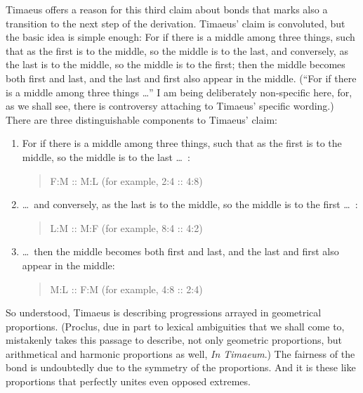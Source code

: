 Timaeus offers a reason for this third claim about bonds that marks also a transition to the next step of the derivation. Timaeus' claim is convoluted, but the basic idea is simple enough: For if there is a middle among three things, such that as the first is to the middle, so the middle is to the last, and conversely, as the last is to the middle, so the middle is to the first; then the middle becomes both first and last, and the last and first also appear in the middle. (``For if there is a middle among three things \ldots'' I am being deliberately non-specific here, for, as we shall see, there is controversy attaching to Timaeus' specific wording.) There are three distinguishable components to Timaeus' claim:
\begin{enumerate}
	\item For if there is a middle among three things, such that as the first is to the middle, so the middle is to the last \ldots\ :
	\begin{quote}
		F:M :: M:L (for example, 2:4 :: 4:8)
	\end{quote}
	\item \ldots\ and conversely, as the last is to the middle, so the middle is to the first \dots\ :
	\begin{quote}
		L:M :: M:F (for example, 8:4 :: 4:2)
	\end{quote}
	\item \ldots\ then the middle becomes both first and last, and the last and first also appear in the middle:
	\begin{quote}
		M:L :: F:M (for example, 4:8 :: 2:4)
	\end{quote}
\end{enumerate}
So understood, Timaeus is describing progressions arrayed in geometrical proportions. (Proclus, due in part to lexical ambiguities that we shall come to, mistakenly takes this passage to describe, not only geometric proportions, but arithmetical and harmonic proportions as well, \emph{In Timaeum}.) The fairness of the bond is undoubtedly due to the symmetry of the proportions. And it is these like proportions that perfectly unites even opposed extremes.  

